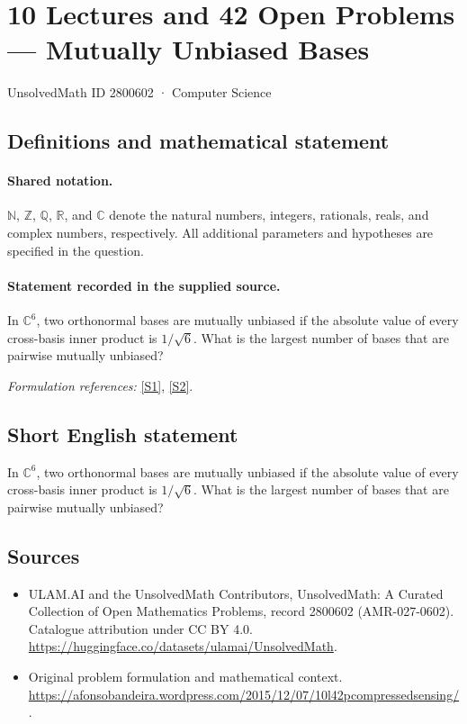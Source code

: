 \documentclass[11pt]{article}
\newcommand{\sref}[2]{\hyperlink{source:#1:#2}{[S#2]}}
\begin{document}
\setcounter{section}{2800601}
\section{10 Lectures and 42 Open Problems — Mutually Unbiased Bases}\label{2800602}
{\small UnsolvedMath ID 2800602 · Computer Science}
\subsection{Definitions and mathematical statement}

\paragraph{Shared notation.}$\mathbb N$, $\mathbb Z$, $\mathbb Q$, $\mathbb R$, and $\mathbb C$ denote the natural numbers, integers, rationals, reals, and complex numbers, respectively. All additional parameters and hypotheses are specified in the question.


\paragraph{Statement recorded in the supplied source.}
In $\mathbb C^6$, two orthonormal bases are mutually unbiased if the absolute value of every cross-basis inner product is $1/\sqrt6$. What is the largest number of bases that are pairwise mutually unbiased?
\par\smallskip\textit{Formulation references:} \sref{2800602}{1}, \sref{2800602}{2}.
\subsection{Short English statement}
In $\mathbb C^6$, two orthonormal bases are mutually unbiased if the absolute value of every cross-basis inner product is $1/\sqrt6$. What is the largest number of bases that are pairwise mutually unbiased?
\subsection{Sources}
\begin{itemize}
\item[\hypertarget{source:2800602:1}{S1}] ULAM.AI and the UnsolvedMath Contributors, UnsolvedMath: A Curated Collection of Open Mathematics Problems, record 2800602 (AMR-027-0602). Catalogue attribution under CC BY 4.0.
\url{https://huggingface.co/datasets/ulamai/UnsolvedMath}.
\item[\hypertarget{source:2800602:2}{S2}] Original problem formulation and mathematical context.
\url{https://afonsobandeira.wordpress.com/2015/12/07/10l42pcompressedsensing/}.
\end{itemize}
\label{end:2800602}
\end{document}
